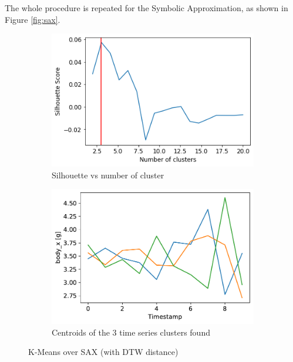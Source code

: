 \documentclass[10pt, a4paper, twocolumn]{article}
\begin{document}
The whole procedure is repeated for the Symbolic Approximation, as shown in Figure \ref{fig:sax}.


\begin{figure}
    \centering
    \begin{subfigure}[t]{0.49\columnwidth}
    \includegraphics[width=\linewidth]{KMeans_silhouette_sax.png}
    \caption{Silhouette vs number of cluster}
    \label{fig:silsax}
    \end{subfigure}
    \begin{subfigure}[t]{0.48\columnwidth}
    \includegraphics[width=\linewidth]{X_SAX_3_cluster.pdf}
    \caption{Centroids of the 3 time series clusters found}
    \label{fig:3cl}
    \end{subfigure}
    \caption{K-Means over SAX (with DTW distance)}
    \label{fig:kmeanssax}
\end{figure}
\end{document}

